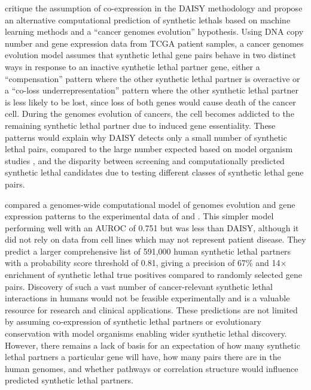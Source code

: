 \citet{Lu2015} critique the assumption of co-expression in the \gls{DAISY} methodology and propose an alternative computational prediction of \glspl{synthetic lethal} based on machine learning methods and a ``cancer \glspl{genome} evolution'' hypothesis. Using \acrshort{DNA} copy number and \gls{gene expression} data from \gls{TCGA} patient samples, a cancer \glspl{genome} evolution model assumes that \gls{synthetic lethal} gene pairs behave in two distinct ways in response to an inactive \gls{synthetic lethal} partner gene, either a ``compensation'' pattern where the other \gls{synthetic lethal} partner is overactive or a ``co-loss underrepresentation'' pattern where the other \gls{synthetic lethal} partner is less likely to be lost, since loss of both genes would cause death of the cancer cell. During the \glspl{genome} evolution of cancers, the cell becomes addicted to the remaining \gls{synthetic lethal} partner due to induced gene essentiality. These patterns would explain why \gls{DAISY} detects only a small number of \gls{synthetic lethal} pairs, compared to the large number expected based on model organism studies \citep{Boone2007}, and the disparity between screening and computationally predicted \gls{synthetic lethal} candidates due to testing different classes of \gls{synthetic lethal} gene pairs. 

\citet{Lu2015} compared a \glspl{genome}-wide computational model of \glspl{genome} evolution and \gls{gene expression} patterns to the experimental data of \citet{Vizeacoumar2013} and \citet{Laufer2013}. This simpler model performing well with an \gls{AUROC} of 0.751 but was less than \gls{DAISY}, although it did not rely on data from cell lines which may not represent patient disease. They predict a larger comprehensive list of 591,000 human \gls{synthetic lethal} partners with a probability score threshold of 0.81, giving a precision of 67\% and 14$\times$ enrichment of \gls{synthetic lethal} true positives compared to randomly selected gene pairs. Discovery of such a vast number of cancer-relevant \gls{synthetic lethal} interactions in humans would not be feasible experimentally and is a valuable resource for research and clinical applications. These predictions are not limited by assuming co-expression of \gls{synthetic lethal} partners or evolutionary conservation with model organisms enabling wider \gls{synthetic lethal} discovery. However, there remains a lack of basis for an expectation of how many \gls{synthetic lethal} partners a particular gene will have, how many pairs there are in the human \glspl{genome}, and whether \glspl{pathway} or correlation structure would influence predicted \gls{synthetic lethal} partners. 

